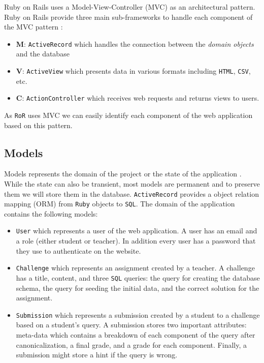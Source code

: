 Ruby on Rails uses a Model-View-Controller (MVC) as an architectural pattern. Ruby on Rails provide three main sub-frameworks to handle each component of the MVC pattern \citep{ruby_on_rails}:
\begin{itemize}
    \item \textbf{M}: \texttt{ActiveRecord} which handles the connection between the \textit{domain objects} and the database
    \item \textbf{V}: \texttt{ActiveView} which presents data in various formats including \texttt{HTML}, \texttt{CSV}, etc.
    \item \textbf{C}: \texttt{ActionController} which receives web requests and returns views to users.
\end{itemize}
As \texttt{RoR} uses MVC we can easily identify each component of the web application based on this pattern.

\subsection{Models}

Models represents the domain of the project \citep{ruby_on_rails} or the state of the application \citep{ruby_on_rails_book}. While the state can also be transient, most models are permanent and to preserve them we will store them in the database. \texttt{ActiveRecord} provides a object relation mapping (ORM) from \texttt{Ruby} objects to \texttt{SQL}. The domain of the application contains the following models:
\begin{itemize}
    \item \texttt{User} which represents a user of the web application. A user has an email and a role (either student or teacher). In addition every user has a password that they use to authenticate on the website.
    \item \texttt{Challenge} which represents an assignment created by a teacher. A challenge has a title, content, and three \texttt{SQL} queries: the query for creating the database schema, the query for seeding the initial data, and the correct solution for the assignment.
    \item \texttt{Submission} which represents a submission created by a student to a challenge based on a student's query. A submission stores two important attributes: meta-data which contains a breakdown of each component of the query after canonicalization, a final grade, and a grade for each component. Finally, a submission might store a hint if the query is wrong.
\end{itemize}

